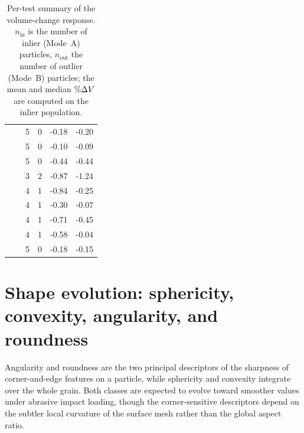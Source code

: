 \begin{table}[htbp]
  \centering
  \caption[Per-test summary of the volume-change response]{Per-test summary of the volume-change response. $n_{\mathrm{in}}$ is the number of inlier (Mode~A) particles, $n_{\mathrm{out}}$ the number of outlier (Mode~B) particles; the mean and median $\pcdV$ are computed on the inlier population.}
  \label{tab:volume-change}
  \begin{tabular}{@{}c l c c S[table-format=-1.2] S[table-format=-1.2]@{}}
    \toprule
     &  &  &  & {} & {}\\
    \midrule
     &  & 5 & 0 & -0.18 & -0.20\\
     &  & 5 & 0 & -0.10 & -0.09\\
     &    & 5 & 0 & -0.44 & -0.44\\
     &    & 3 & 2 & -0.87 & -1.24\\
     &  & 4 & 1 & -0.84 & -0.25\\
     &  & 4 & 1 & -0.30 & -0.07\\
     &    & 4 & 1 & -0.71 & -0.45\\
     &  & 4 & 1 & -0.58 & -0.04\\
     &  & 5 & 0 & -0.18 & -0.15\\
    \bottomrule
  \end{tabular}
\end{table}

\section{Shape evolution: sphericity, convexity, angularity, and roundness}
\label{sec:shape-evolution}

Angularity and roundness are the two principal descriptors of the sharpness of corner-and-edge features on a particle, while sphericity and convexity integrate over the whole grain. Both classes are expected to evolve toward smoother values under abrasive impact loading, though the corner-sensitive descriptors depend on the subtler local curvature of the surface mesh rather than the global aspect ratio.

